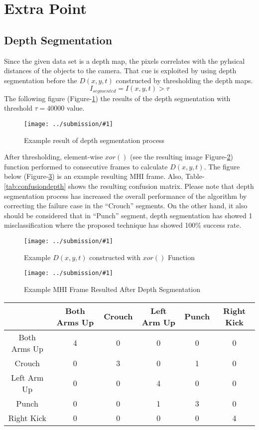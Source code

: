 \documentclass{article}
\newcommand{\listFigure}[3]{ \begin{figure}[H]
\texttt{[image: ../submission/\#1]}
		\caption{#2\label{fig:#3}} 
	\end{figure}		
}
\begin{document}
\section{Extra Point}
\subsection{Depth Segmentation}
Since the given data set is a depth map, the pixels correlates with the
pyhsical distances of the objects to the camera. That cue is exploited by using
depth segmentation before the $D(x,y,t)$ constructed by thresholding the depth
maps. 
$$I_{segmented} = I(x,y,t) > \tau$$
The following figure (Figure-\ref{fig:depthSegmentation}) the results of the
depth segmentation with threshold $\tau=40000$ value.

\listFigure{depthSegmentation.png}{Example result
of depth segmentation process}{depthSegmentation} 
 
After thresholding, element-wise $xor()$ (see the resulting image
Figure-\ref{fig:XOR}) function performed to consecutive frames to calculate $D(x,y,t)$. The figure below (Figure-\ref{fig:MHIDepth}) is an example
resulting MHI frame. Also, Table-\ref{tab:confusiondepth} shows the resulting
confusion matrix. Please note that depth segmentation process has increased the
overall performance of the algorithm by correcting the failure case in
the ``Crouch'' segments. On the other hand, it also should be considered that in
``Punch'' segment, depth segmentation has showed 1 misclassification where the
proposed technique has showed  100\% success rate.
\listFigure{XOR}{Example $D(x,y,t)$ constructed with $xor()$  Function}{XOR}

\listFigure{MHIDepth}{Example MHI Frame Resulted After Depth
Segmentation}{MHIDepth}

\begin{center}\label{tab:confusiondepth}
	\begin{tabular}{ |c | c | c | c | c | c| }
	\hline
	  & Both Arms Up & Crouch & Left Arm Up & Punch & Right Kick \\ \hline
	  Both Arms Up & 4 & 0 & 0 & 0 & 0 \\ \hline
	  Crouch & 0 & 3 & 0 & 1 & 0 \\ \hline
	  Left Arm Up & 0 & 0 & 4 & 0 & 0 \\ \hline
	  Punch & 0 & 0 & 1 & 3 & 0 \\ \hline
	  Right Kick & 0 & 0 & 0 & 0 & 4 \\
	\hline
	\end{tabular}
\end{center}
\end{document}
